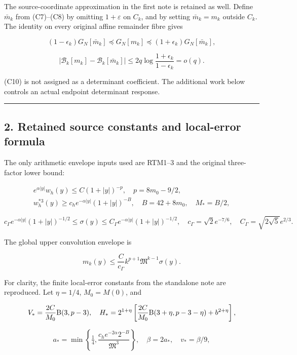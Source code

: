 \documentclass[11pt,a4paper]{article}
\begin{document}
The source-coordinate approximation in the first note is retained as well. Define \(\bar m_k\) from (C7)--(C8) by omitting \(1+\varepsilon\) on \(C_k\), and by setting \(\bar m_k=m_k\) outside \(C_k\). The identity on every original affine remainder fibre gives

\[
(1-\epsilon_k)G_N[\bar m_k]\preceq G_N[m_k]
\preceq(1+\epsilon_k)G_N[\bar m_k],
\]

\[
|\mathcal B_k[m_k]-\mathcal B_k[\bar m_k]|
\le2q\log\frac{1+\epsilon_k}{1-\epsilon_k}=o(q).
\tag{C11}
\]

(C10) is not assigned as a determinant coefficient. The additional work below controls an actual endpoint determinant response.

\begin{center}\rule{0.5\linewidth}{0.5pt}\end{center}

\subsection{2. Retained source constants and local-error formula}\label{loc:retained-source-constants-and-local-error-formula}

The only arithmetic envelope inputs used are RTM1--3 and the original three-factor lower bound:

\[
\begin{gathered}
e^{\alpha|y|}w_h(y)\le C(1+|y|)^{-p},\quad
p=8m_0-9/2,\\
w_h^{*3}(y)\ge c_h e^{-\alpha|y|}(1+|y|)^{-B},
\quad B=42+8m_0,\quad M_*=B/2,
\end{gathered}\tag{L1}
\]

\[
c_\Gamma e^{-\alpha|y|}(1+|y|)^{-1/2}\le\sigma(y)
\le C_\Gamma e^{-\alpha|y|}(1+|y|)^{-1/2},
\quad c_\Gamma=\sqrt2e^{-7/6},\quad C_\Gamma=\sqrt{2\sqrt5}e^{2/3}.
\]

The global upper convolution envelope is

\[
m_k(y)\le\frac C{c_\Gamma}k^{p+1}\mathfrak M^{k-1}\sigma(y).
\tag{L2}
\]

For clarity, the finite local-error constants from the standalone note are reproduced. Let \(\eta=1/4\), \(M_0=M(0)\), and

\[
V_* =\frac{2C}{M_0}{\rm B}(3,p-3),\quad
H_* =2^{1+\eta}\left[\frac{2C}{M_0}{\rm B}(3+\eta,p-3-\eta)+b^{2+\eta}\right],
\]

\[
a_* =\min\left\{\tfrac14,\frac{c_he^{-2\alpha}2^{-B}}{\mathfrak M^3}\right\},
\quad\beta=2a_*,\quad v_*=\beta/9,
\]
\end{document}
